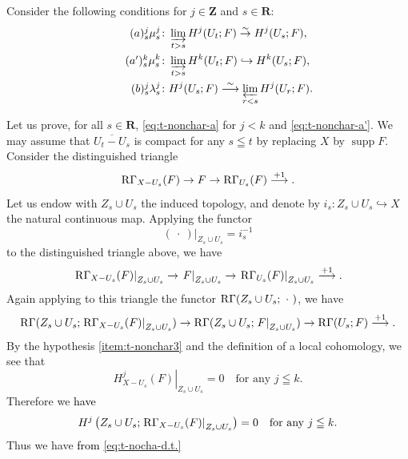﻿\documentclass[a4paper,leqno,dvipdfmx]{jsarticle}
\makeatletter
\theoremstyle{definition}
\newcommand{\zz}{\mathbf{Z}}
\newcommand{\rr}{\mathbf{R}}
\renewenvironment{proof}[1][\proofname]{\par
  \pushQED{\qed}%
  \normalfont \topsep6\p@\@plus6\p@\relax
  \trivlist
  \item[\hskip\labelsep
         \bfseries
    {#1}]\ignorespaces
}{%
  \popQED\endtrivlist\@endpefalse
}
\renewcommand{\proofname}{Proof.}
\numberwithin{equation}{section}
\newcommand{\supp}{\mathop{\mathrm{supp}}\nolimits}
\newcommand{\RG}{\mathop{\mathrm{R}\hspace{-0pt}\Gamma}\nolimits}
\newcommand{\simar}{\mathrel{\overset{\sim}{\rightarrow}}}%
\newcommand{\simarr}{\mathrel{\overset{\sim}{\longrightarrow}}}%
\newcommand{\indlim}[1][]{\mathop{\varinjlim}\limits_{#1}}
\newcommand{\prolim}[1][]{\mathop{\varprojlim}\limits_{#1}}
\newcommand{\blk}{\mathord{\ \cdot\ }}
\newcommand{\mres}[2][]{{\left.{#1}\right\rvert}_{#2}}
\theoremstyle{mystyle}
\newcommand{\smi}{-}
\makeatother
\begin{document}
\begin{proof}[{\textcolor{black}{Proof of Theorem \ref{prp:t-nonchar}}}]
  Consider the following conditions for 
  \(j\in\zz\) and \(s\in\rr\):
  \begin{align}
      \tag*{\((a)^j_s\)}\label{eq:t-nonchar-a}
      \mu_{s}^{j}&\colon
      \indlim[t>s] H^{j}(U_t;F) \simar H^{j}(U_s;F),\\
      \tag*{\((a')^k_s\)}\label{eq:t-nonchar-a'}
      \mu_{s}^{k}&\colon
      \indlim[t>s] H^{k}(U_t;F) \hookrightarrow H^{k}(U_s;F),\\
      \tag*{\((b)^j_s\)}\label{eq:t-nonchar-b}
      \lambda_{s}^{j}&\colon
      H^{j}(U_s;F)\simarr \prolim[r<s] H^{j}(U_r;F).
  \end{align}

  Let us prove, 
  for all \(s\in \rr\), 
  \ref{eq:t-nonchar-a} for \(j<k\) and \ref{eq:t-nonchar-a'}. 
  We may assume that \(\overline{U_{t}\smi U_{s}}\) is compact 
  for any \(s\leqq t\) by replacing \(X\) by \(\supp{F}\). 
  Consider the distinguished triangle\[
    \RG_{X\smi U_{s}}(F)
    \to
    F
    \to
    \RG_{U_{s}}(F)
    \overset{+1}{\longrightarrow}.
  \]
  Let us endow with \(Z_{s}\cup U_{s}\) the induced topology, and
  denote by \(
    i_{s}\colon Z_{s}\cup U_{s}\hookrightarrow X
  \) the natural continuous map.  
  Applying the functor \[
    \mres[(\blk)]{Z_{s}\cup U_{s}}=i_{s}^{-1}
  \] to the distinguished triangle above, we have \[
    \mres[\RG_{X\smi U_{s}}(F)]{Z_{s}\cup U_{s}}  
    \to
    \mres[F]{Z_{s}\cup U_{s}}  
    \to
    \mres[\RG_{U_{s}}(F)]{Z_{s}\cup U_{s}}  
    \overset{+1}{\longrightarrow}.
  \]
  Again applying to this triangle 
  the functor \(\RG(Z_{s}\cup U_{s};\blk)\), 
  we have
  \begin{equation}\label{eq:t-nocha-d.t.}
    \RG(Z_{s}\cup U_{s};\mres[\RG_{X\smi U_{s}}(F)]{Z_{s}\cup U_{s}})
    \to
    \RG(Z_{s}\cup U_{s};\mres[F]{Z_{s}\cup U_{s}})
    \to
    \RG(U_{s};F)
    \overset{+1}{\longrightarrow}. 
  \end{equation}
  By the hypothesis \eqref{item:t-nonchar3} and 
  the definition of a local cohomology, 
  we see that
  \[
    \mres[H^{j}_{X\smi U_{s}}(F)]{Z_{s}\cup U_{s}}=0
    \quad
    \text{for any \(j\leqq k\).}
  \]
  Therefore we \textcolor{black}{have}
  \[
    H^{j}\left(Z_{s}\cup U_{s};
      \mres[\RG_{X\smi U_{s}}(F)]{Z_{s}\cup U_{s}}
    \right)=0
    \quad
    \text{for any \(j\leqq k\).}
  \]
  Thus we have \textcolor{black}{from \eqref{eq:t-nocha-d.t.}}
  \begin{align}
    \label{eq:a-iso}

\end{align}
\end{proof}
\end{document}
